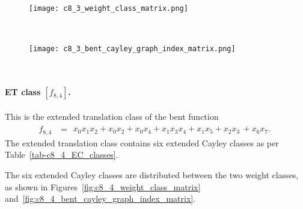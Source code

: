 \documentclass[12pt,a4paper]{article}
\begin{document}
\begin{figure}[!bhpt] %
\centering
\begin{minipage}{.48\textwidth}
  \centering
  \texttt{[image: c8\_3\_weight\_class\_matrix.png]}
  \label{fig:c8_3_weight_class_matrix}
\end{minipage}%
~~~~
\begin{minipage}{.48\textwidth}
  \centering
  \texttt{[image: c8\_3\_bent\_cayley\_graph\_index\_matrix.png]}
  \label{fig:c8_3_bent_cayley_graph_index_matrix}
\end{minipage}
\end{figure}
~
\newpage
%
\paragraph*{ET class $[f_{8,4}]$.}
This is the extended translation class of the bent function
\small{}
\begin{align*}
f_{ 8 , 4 } &=
\begin{array}{l}
x_{0} x_{1} x_{2} + x_{0} x_{2} + x_{0} x_{4} + x_{1} x_{3} x_{4} + x_{1} x_{5} + x_{2} x_{3}\, +
x_{6} x_{7}.
\end{array}
\end{align*}
\normalsize{}
The extended translation class contains six extended Cayley classes as per Table~\ref{tab-c8_4_EC_classes}.

The six extended Cayley classes are distributed between the two weight classes,
as shown in Figures~\ref{fig:c8_4_weight_class_matrix} and~\ref{fig:c8_4_bent_cayley_graph_index_matrix}.
\end{document}
